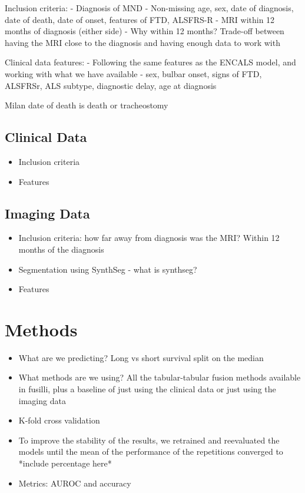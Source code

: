 Inclusion criteria:
- Diagnosis of MND
- Non-missing age, sex, date of diagnosis, date of death, date of onset, features of FTD, ALSFRS-R
- MRI within 12 months of diagnosis (either side)
    - Why within 12 months? Trade-off between having the MRI close to the diagnosis and having enough data to work with

Clinical data features:
- Following the same features as the ENCALS model, and working with what we have available
- sex, bulbar onset, signs of FTD, ALSFRSr, ALS subtype, diagnostic delay, age at diagnosis

Milan date of death is death or tracheostomy

\subsection{Clinical Data}
\begin{itemize}
    \item Inclusion criteria
    \item Features
\end{itemize}

\subsection{Imaging Data}
\begin{itemize}
    \item Inclusion criteria: how far away from diagnosis was the MRI? Within 12 months of the diagnosis
    \item Segmentation using SynthSeg - what is synthseg?
    \item Features
\end{itemize}

\section{Methods}
\begin{itemize}
    \item What are we predicting? Long vs short survival split on the median
    \item What methods are we using? All the tabular-tabular fusion methods available in fusilli, plus a baseline of just using the clinical data or just using the imaging data
    \item K-fold cross validation
    \item To improve the stability of the results, we retrained and reevaluated the models until the mean of the performance of the repetitions converged to *include percentage here*
    \item Metrics: AUROC and accuracy
\end{itemize}

